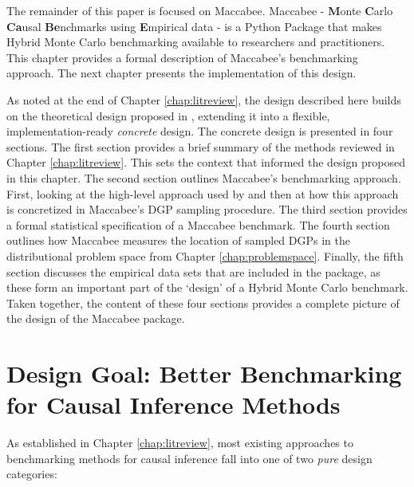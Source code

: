 \documentclass[../main.tex]{subfiles}
\begin{document}

The remainder of this paper is focused on Maccabee. Maccabee - \textbf{M}onte \textbf{C}arlo \textbf{Ca}usal \textbf{Be}nchmarks using \textbf{E}mpirical data - is a Python Package that makes Hybrid Monte Carlo benchmarking available to researchers and practitioners. This chapter provides a formal description of Maccabee's benchmarking approach. The next chapter presents the implementation of this design.

\vspace{\baselineskip}

As noted at the end of Chapter \ref{chap:litreview}, the design described here builds on the theoretical design proposed in \textcite{Dorie2019Automated1}, extending it into a flexible, implementation-ready \textit{concrete} design. The concrete design is presented in four sections. The first section provides a brief summary of the methods reviewed in Chapter \ref{chap:litreview}. This sets the context that informed the design proposed in this chapter. The second section outlines Maccabee's benchmarking approach. First, looking at the high-level approach used by \textcite{Dorie2019Automated1} and then at how this approach is concretized in Maccabee's DGP sampling procedure. The third section provides a formal statistical specification of a Maccabee benchmark. The fourth section outlines how Maccabee measures the location of sampled DGPs in the distributional problem space from Chapter \ref{chap:problemspace}. Finally, the fifth section discusses the empirical data sets that are included in the package, as these form an important part of the `design' of a Hybrid Monte Carlo benchmark. Taken together, the content of these four sections provides a complete picture of the design of the Maccabee package.

\section{Design Goal: Better Benchmarking for Causal Inference Methods}
\label{mac:problems}

As established in Chapter \ref{chap:litreview}, most existing approaches to benchmarking methods for causal inference fall into one of two \textit{pure} design categories:
\end{document}
